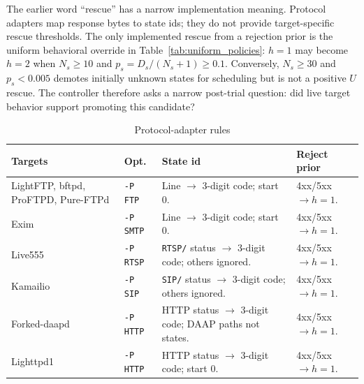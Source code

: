 \documentclass[final,5p,times,number]{elsarticle}
\begin{document}
The earlier word ``rescue'' has a narrow implementation meaning. Protocol adapters map response bytes to state ids; they do not provide target-specific rescue thresholds. The only implemented rescue from a rejection prior is the uniform behavioral override in Table~\ref{tab:uniform_policies}: $h=1$ may become $h=2$ when $N_s\ge10$ and $p_s=D_s/(N_s+1)\ge0.1$. Conversely, $N_s\ge30$ and $p_s<0.005$ demotes initially unknown states for scheduling but is not a positive $U$ rescue. The controller therefore asks a narrow post-trial question: did live target behavior support promoting this candidate?

\begin{table}[!t]
\centering
\caption{Protocol-adapter rules}
\label{tab:protocol_adapter_rules}
{\scriptsize
\setlength{\tabcolsep}{3.2pt}
\renewcommand{\arraystretch}{1.08}
\begin{tabularx}{\textwidth}{>{\raggedright\arraybackslash}p{}
>{\raggedright\arraybackslash}p{}
>{\raggedright\arraybackslash}X
>{\raggedright\arraybackslash}p{}}
\toprule
Targets & Opt. & State id & Reject prior \\
\midrule
LightFTP, bftpd, ProFTPD, Pure-FTPd &
\texttt{-P FTP} &
Line $\rightarrow$ 3-digit code; start 0. &
4xx/5xx $\rightarrow h=1$. \\
Exim &
\texttt{-P SMTP} &
Line $\rightarrow$ 3-digit code; start 0. &
4xx/5xx $\rightarrow h=1$. \\
Live555 &
\texttt{-P RTSP} &
\texttt{RTSP/} status $\rightarrow$ 3-digit code; others ignored. &
4xx/5xx $\rightarrow h=1$. \\
Kamailio &
\texttt{-P SIP} &
\texttt{SIP/} status $\rightarrow$ 3-digit code; others ignored. &
4xx/5xx $\rightarrow h=1$. \\
Forked-daapd &
\texttt{-P HTTP} &
HTTP status $\rightarrow$ 3-digit code; DAAP paths not states. &
4xx/5xx $\rightarrow h=1$. \\
Lighttpd1 &
\texttt{-P HTTP} &
HTTP status $\rightarrow$ 3-digit code; start 0. &
4xx/5xx $\rightarrow h=1$. \\
\bottomrule
\end{tabularx}
}
\end{table}
\end{document}
